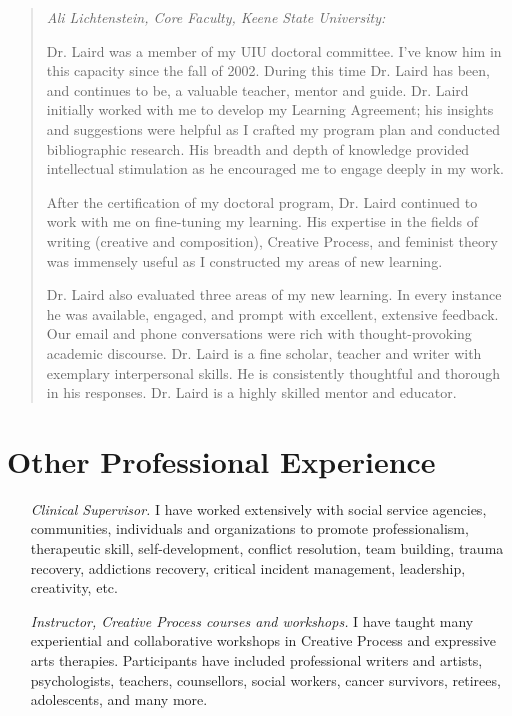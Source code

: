 \documentclass[10pt,DIV09,letterpaper,oneside,headsepline]{scrreprt}
\begin{document}
\begin{quotation}
\textit{Ali Lichtenstein, Core Faculty, Keene State University:\\}

Dr. Laird was a member of my UIU doctoral committee. I've know him in this capacity since the fall of 2002. During this time Dr. Laird has been, and continues to be, a valuable teacher, mentor and guide. Dr. Laird initially worked with me to develop my Learning Agreement; his insights and suggestions were helpful as I crafted my program plan and conducted bibliographic research. His breadth and depth of knowledge provided intellectual stimulation as he encouraged me to engage deeply in my work.

After the certification of my doctoral program, Dr. Laird continued to work with me on fine-tuning my learning. His expertise in the fields of writing (creative and composition), Creative Process, and feminist theory was immensely useful as I constructed my areas of new learning.

Dr. Laird also evaluated three areas of my new learning. In every instance he was available, engaged, and prompt with excellent, extensive feedback. Our email and phone conversations were rich with thought-provoking academic discourse. Dr. Laird is a fine scholar, teacher and writer with exemplary interpersonal skills. He is consistently thoughtful and thorough in his responses. Dr. Laird is a highly skilled mentor and educator.

\end{quotation}


\chapter{Other Professional Experience}

\begin{itemize} \item [\textit{Clinical Supervisor.}] I have worked extensively with social service agencies, communities, individuals and organizations to promote professionalism, therapeutic skill, self-development, conflict resolution, team building, trauma recovery, addictions recovery, critical incident management, leadership, creativity, etc. \end{itemize}

\begin{itemize} \item [\textit{Instructor, Creative Process courses and workshops.}] I have taught many experiential and collaborative workshops in Creative Process and expressive arts therapies. Participants have included professional writers and artists, psychologists, teachers, counsellors, social workers, cancer survivors, retirees, adolescents, and many more. \end{itemize}
\end{document}
